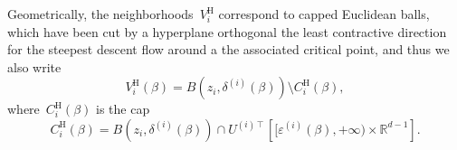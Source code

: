 \documentclass[10pt]{article}
\newcommand{\e}{\mathrm{e}}
\newcommand{\R}{\mathbb{R}}
\newcommand{\1}{\mathbbm 1}
\newcommand{\epsBoundary}[1]{\varepsilon^{(#1)}} %
\newcommand{\deltaRadius}[1]{\delta^{(#1)}} %
\newcommand{\epsLimit}[1]{\alpha^{(#1)}} %
\newcommand{\localNeighborhood}[1]{V_{#1}^{\mathrm H}}
\newcommand{\localCap}[1]{C_{#1}^{\mathrm H}}
\newcommand{\hessEigval}[2]{\nu^{(#1)}_{#2}} %
\newcommand{\deltai}{\delta^{(i)}}
\newcommand{\varepsiloni}{\varepsilon^{(i)}}
\begin{document}
    Geometrically, the neighborhoods~$\localNeighborhood{i}$ correspond to capped Euclidean balls, which have been cut by a hyperplane orthogonal the least contractive direction for the steepest descent flow around a the associated critical point, and thus we also write
    \begin{equation}
        \localNeighborhood{i}(\beta) = B(z_i,\deltaRadius{i}(\beta)) \setminus \localCap{i}(\beta),
    \end{equation}
    where~$\localCap{i}(\beta)$ is the cap
    \begin{equation}
        \label{eq:def_ball_cap}
        \localCap{i}(\beta) = B(z_i,\deltaRadius{i}(\beta))\cap U^{(i)\intercal}\left[[\epsBoundary{i}(\beta),+\infty)\times \R^{d-1}\right].
    \end{equation}
    

\end{document}
